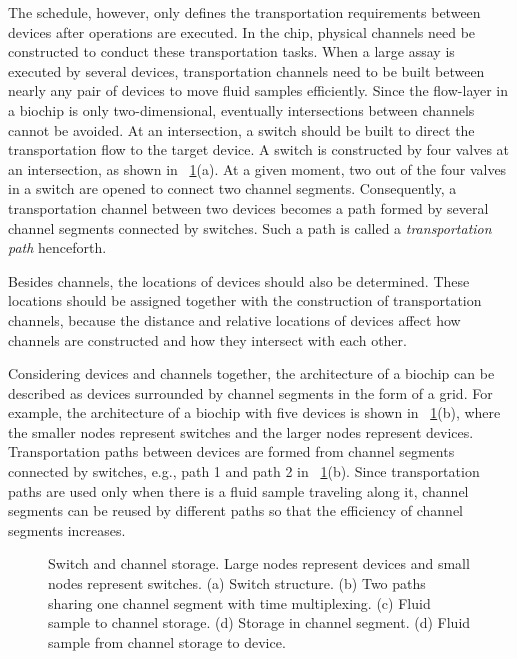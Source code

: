 The schedule, however, only defines the transportation requirements between
devices after operations are executed. In the chip, physical channels need
be constructed to conduct these transportation tasks.
When a large assay is executed by several devices,
transportation channels need to be built between nearly
any pair of devices to move fluid samples
efficiently.
Since the flow-layer in a biochip is only two-dimensional, eventually
intersections between channels cannot be avoided. At an intersection,
a switch should be built to direct the transportation
flow to the target device. A switch is constructed by
four valves at an intersection, as shown in \figname~\ref{fig:switch}(a). At a
given moment, two out of the four valves in a switch are opened to
connect two channel segments. Consequently, a transportation
channel between two devices becomes a path
formed by several channel segments connected by switches.
Such a path is called a \textit{transportation path} henceforth.

Besides channels, the locations of devices should also be determined.
These locations should be assigned together with the construction of
transportation channels, because the distance and relative locations of devices
affect how channels are constructed and how they intersect with each other.

Considering devices and channels together, the architecture of a biochip can
be described as devices surrounded by channel segments in the form of a grid.
For example, the architecture of a biochip with five devices is
shown in \figname~\ref{fig:switch}(b), where the smaller nodes
represent switches and the larger nodes represent devices.
Transportation paths between devices are
formed from channel segments connected by switches, e.g., path 1 and path 2
in \figname~\ref{fig:switch}(b).
Since transportation paths are used only when there is a fluid sample
traveling along it, channel segments can be reused by
different paths so that the efficiency of channel segments increases.


\begin{figure}[t]
{\figurefontsize
\centering

\caption{Switch and channel storage. Large nodes represent devices and
small nodes represent switches.  (a) Switch structure. (b) Two paths
sharing one channel segment with time multiplexing. (c) Fluid sample to
channel storage. (d) Storage in channel segment. (d) Fluid sample from channel
storage to device.}
\label{fig:switch}
}
\end{figure}

